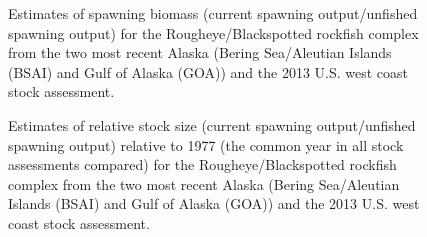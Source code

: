 \documentclass[
]{scrartcl}
\begin{document}
\begin{figure}[H]


\caption{\label{fig-SO_comp}Estimates of spawning biomass (current
spawning output/unfished spawning output) for the Rougheye/Blackspotted
rockfish complex from the two most recent Alaska (Bering Sea/Aleutian
Islands (BSAI) and Gulf of Alaska (GOA)) and the 2013 U.S. west coast
stock assessment.}

\end{figure}%

\begin{figure}[H]


\caption{\label{fig-RSS_comp}Estimates of relative stock size (current
spawning output/unfished spawning output) relative to 1977 (the common
year in all stock assessments compared) for the Rougheye/Blackspotted
rockfish complex from the two most recent Alaska (Bering Sea/Aleutian
Islands (BSAI) and Gulf of Alaska (GOA)) and the 2013 U.S. west coast
stock assessment.}

\end{figure}%
\end{document}
